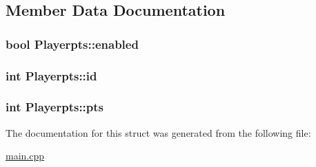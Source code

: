 \subsection{Member Data Documentation}
\hypertarget{structPlayerpts_ae04c2c5cea4522d47fe338894f59b00a}{}
\subsubsection[{enabled}]{\setlength{\rightskip}{0pt plus 5cm}bool Playerpts\+::enabled}\label{structPlayerpts_ae04c2c5cea4522d47fe338894f59b00a}
\hypertarget{structPlayerpts_a99502763596406ef58b5046c09ed702d}{}
\subsubsection[{id}]{\setlength{\rightskip}{0pt plus 5cm}int Playerpts\+::id}\label{structPlayerpts_a99502763596406ef58b5046c09ed702d}
\hypertarget{structPlayerpts_a9385425213b4bf02a37b1f5b72cf3925}{}
\subsubsection[{pts}]{\setlength{\rightskip}{0pt plus 5cm}int Playerpts\+::pts}\label{structPlayerpts_a9385425213b4bf02a37b1f5b72cf3925}


The documentation for this struct was generated from the following file\+:\begin{DoxyCompactItemize}
\item 
\hyperlink{main_8cpp}{main.\+cpp}\end{DoxyCompactItemize}
